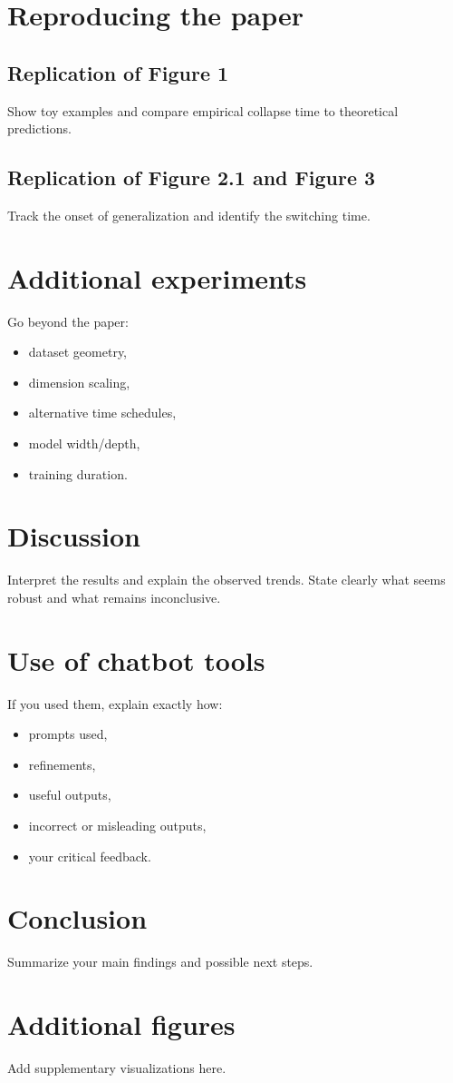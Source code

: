 \documentclass[10pt,a4paper]{article}
\theoremstyle{definition}
\begin{document}
\section{Reproducing the paper}
\subsection{Replication of Figure 1}
Show toy examples and compare empirical collapse time to theoretical predictions.

\subsection{Replication of Figure 2.1 and Figure 3}
Track the onset of generalization and identify the switching time.

\section{Additional experiments}
Go beyond the paper:
\begin{itemize}[leftmargin=1.5em]
    \item dataset geometry,
    \item dimension scaling,
    \item alternative time schedules,
    \item model width/depth,
    \item training duration.
\end{itemize}

\section{Discussion}
Interpret the results and explain the observed trends.
State clearly what seems robust and what remains inconclusive.

\section{Use of chatbot tools}
If you used them, explain exactly how:
\begin{itemize}[leftmargin=1.5em]
    \item prompts used,
    \item refinements,
    \item useful outputs,
    \item incorrect or misleading outputs,
    \item your critical feedback.
\end{itemize}

\section{Conclusion}
Summarize your main findings and possible next steps.




\appendix
\section{Additional figures}
Add supplementary visualizations here.
\end{document}
